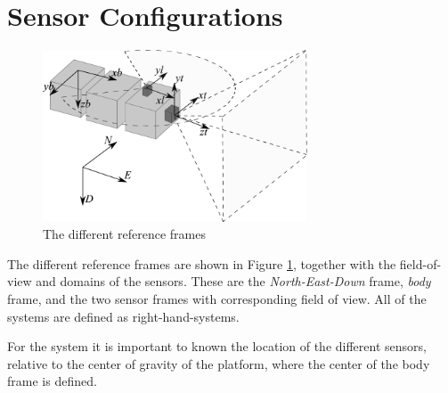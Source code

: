\section{Sensor Configurations}
\label{chap3:sec-sensorconfig}
\begin{figure}[htbp]
    \centering
    \includegraphics[width=0.7\textwidth]{pics/sensor-config}
    \caption{The different reference frames}
    \label{chap3:fig-sensor-frames}
\end{figure}
The different reference frames are shown in Figure \ref{chap3:fig-sensor-frames}, together
with the field-of-view and domains of the sensors. These are the
\emph{North-East-Down} frame, \emph{body} frame, and the two sensor frames with
corresponding field of view. All of the systems are defined as right-hand-systems. 

For the system it is important to known the location of the different sensors, relative to
the center of gravity of the platform, where the center of the body frame is 
defined. 


